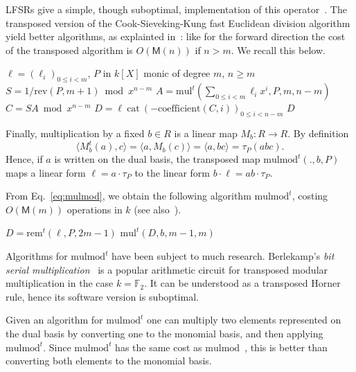\documentclass[12pt]{article}
\def\M {\ensuremath{\mathsf{M}}}
\def\F {\ensuremath{\mathbb{F}}}
\def\mul {\ensuremath{\mathrm{mul}}}
\def\rem {\ensuremath{\mathrm{rem}}}
\def\cat {\ensuremath{\mathrm{cat}}}
\def\coeff {\ensuremath{\mathrm{coefficient}}}
\def\mulmod {\ensuremath{\mathrm{mulmod}}}
\def\rev {\ensuremath{\mathrm{rev}}}
\newcommand{\bk}[2]{\langle#1,#2\rangle}
\begin{document}
LFSRs give a simple, though suboptimal, implementation of this
operator~\cite{todo}. The transposed version of the
Cook-Sieveking-Kung fast Euclidean division algorithm yield better
algorithms, as explainted in~\cite{bostan+lecerf+schost:tellegen}:
like for the forward direction the cost of the transposed algorithm is
$O(\M(n))$ if $n>m$. We recall this below.

\begin{algorithm}[H]
  \caption{$\rem^t(\ell,P,k)$}
  \begin{algorithmic}[1]
    \REQUIRE $\ell=(\ell_i)_{0 \le i < m}$, $P$ in $k[X]$ monic of degree $m$, $n \ge m$
    \STATE $S = 1/\rev(P, m+1) \bmod x^{n-m}$
    \STATE $A = \mul^t( \sum_{0 \le i < m} \ell_{i}x^i, P, m, n-m)$
    \STATE $C = S A \bmod x^{n-m}$
    \STATE $D = \ell ~\cat~ (-\coeff(C,i))_{0 \le i < n-m}$
    \RETURN $D$
  \end{algorithmic}
\end{algorithm}

Finally, multiplication by a fixed $b\in R$ is a linear map $M_b:R\to
R$. By definition
\begin{equation}
  \label{eq:mulmodt-def}
  \bk{M_b^t(a)}{c} = \bk{a}{M_b(c)} = \bk{a}{bc} = \tau_P(abc).
\end{equation}
Hence, if $a$ is written on the dual basis, the transposed map
$\mulmod^t(.,b,P)$ maps a linear form $\ell = a\cdot\tau_P$ to the
linear form $b \cdot \ell=ab\cdot\tau_P$.  

From Eq.~\eqref{eq:mulmod},
we obtain the following algorithm $\mulmod^t$, costing $O(\M(m))$
operations in $k$ (see
also~\cite{shoup99,bostan+lecerf+schost:tellegen}).


\begin{algorithm}[H]
  \caption{$\mulmod^t(\ell,b,P)$}
  \begin{algorithmic}[1]
    \STATE $D = \rem^t(\ell,P,2m-1)$
    \RETURN $\mul^t(D, b, m-1, m)$
  \end{algorithmic}
\end{algorithm}

Algorithms for $\mulmod^t$ have been subject to much
research. Berlekamp's \emph{bit serial multiplication}~\cite{todo} is
a popular arithmetic circuit for transposed modular multiplication in
the case $k=\F_2$. It can be understood as a transposed Horner
rule, hence its software version is suboptimal.

Given an algorithm for $\mulmod^t$ one can multiply two elements
represented on the dual basis by converting one to the monomial basis,
and then applying $\mulmod^t$. Since $\mulmod^t$ has the same cost as
$\mulmod$~\cite{shoup99,bostan+lecerf+schost:tellegen}, this is better
than converting both elements to the monomial basis.
\end{document}
